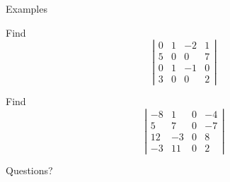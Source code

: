 \documentclass{beamer}
\begin{document}
\begin{frame}{Examples}
  \begin{example}
    Find
    \begin{equation*}
      \left|
        \begin{array}{cccc}
          0&1&-2&1\\
          5&0&0&7\\
          0&1&-1&0\\
          3&0&0&2
        \end{array}
      \right|
    \end{equation*}
  \end{example}
  \begin{example}
    Find
    \begin{equation*}
      \left|
        \begin{array}{cccc}
          -8&1&0&-4\\
          5&7&0&-7\\
          12&-3&0&8\\
          -3&11&0&2
        \end{array}
      \right|
    \end{equation*}
  \end{example}
\end{frame}

\begin{frame}
  Questions?
\end{frame}
\end{document}
